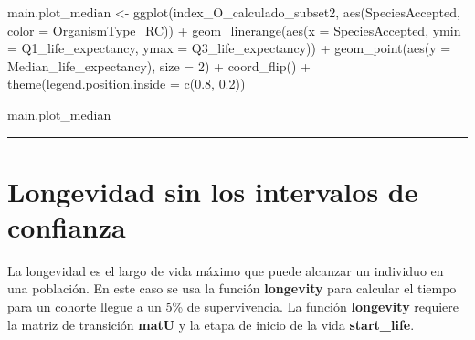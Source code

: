 \documentclass[
  12pt,
  letterpaper,
]{book}
\newenvironment{Shaded}{\begin{snugshade}}{\end{snugshade}}
\newcommand{\AttributeTok}[1]{\textcolor[rgb]{0.40,0.45,0.13}{#1}}
\newcommand{\DecValTok}[1]{\textcolor[rgb]{0.68,0.00,0.00}{#1}}
\newcommand{\FloatTok}[1]{\textcolor[rgb]{0.68,0.00,0.00}{#1}}
\newcommand{\FunctionTok}[1]{\textcolor[rgb]{0.28,0.35,0.67}{#1}}
\newcommand{\NormalTok}[1]{\textcolor[rgb]{0.00,0.23,0.31}{#1}}
\newcommand{\OtherTok}[1]{\textcolor[rgb]{0.00,0.23,0.31}{#1}}
\newcommand{\SpecialCharTok}[1]{\textcolor[rgb]{0.37,0.37,0.37}{#1}}
\begin{document}
\begin{Shaded}
\begin{Highlighting}[]
\NormalTok{main.plot\_median }\OtherTok{\textless{}{-}} \FunctionTok{ggplot}\NormalTok{(index\_O\_calculado\_subset2, }\FunctionTok{aes}\NormalTok{(SpeciesAccepted, }\AttributeTok{color =}\NormalTok{ OrganismType\_RC)) }\SpecialCharTok{+}
  \FunctionTok{geom\_linerange}\NormalTok{(}\FunctionTok{aes}\NormalTok{(}\AttributeTok{x =}\NormalTok{ SpeciesAccepted, }\AttributeTok{ymin =}\NormalTok{ Q1\_life\_expectancy, }\AttributeTok{ymax =}\NormalTok{ Q3\_life\_expectancy)) }\SpecialCharTok{+}
  \FunctionTok{geom\_point}\NormalTok{(}\FunctionTok{aes}\NormalTok{(}\AttributeTok{y =}\NormalTok{ Median\_life\_expectancy), }\AttributeTok{size =} \DecValTok{2}\NormalTok{) }\SpecialCharTok{+}
  \FunctionTok{coord\_flip}\NormalTok{() }\SpecialCharTok{+}
  \FunctionTok{theme}\NormalTok{(}\AttributeTok{legend.position.inside =} \FunctionTok{c}\NormalTok{(}\FloatTok{0.8}\NormalTok{, }\FloatTok{0.2}\NormalTok{))}



\NormalTok{main.plot\_median}
\end{Highlighting}
\end{Shaded}

\begin{center}\rule{0.5\linewidth}{0.5pt}\end{center}

\section{Longevidad sin los intervalos de
confianza}\label{longevidad-sin-los-intervalos-de-confianza}

La longevidad es el largo de vida máximo que puede alcanzar un individuo
en una población. En este caso se usa la función \textbf{longevity} para
calcular el tiempo para un cohorte llegue a un 5\% de supervivencia. La
función \textbf{longevity} requiere la matriz de transición
\textbf{matU} y la etapa de inicio de la vida \textbf{start\_life}.
\end{document}
